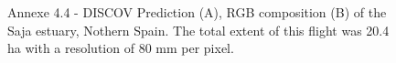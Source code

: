 \documentclass[
  letterpaper,
  11pt,
  english,
  singlespacing,
  headsepline]{MastersDoctoralThesis}
\newcommand{\chaptertopimage}{Chapter1/img/seagrasses.png}
\newcommand{\chapterbottomimage}{Chapter1/img/seagrasses.png}
\begin{document}
\begin{spacing}{1.5}
\begin{figure}


\caption{\label{fig-Saja_g}Annexe 4.4 - DISCOV Prediction (A), RGB
composition (B) of the Saja estuary, Nothern Spain. The total extent of
this flight was 20.4 ha with a resolution of 80 mm per pixel.}

\end{figure}%

\end{spacing}

\renewcommand{\chaptertopimage}{Chapter5/img/top.png}
\renewcommand{\chapterbottomimage}{Chapter5/img/Bottom.png}

\newpage\null\thispagestyle{empty}\newpage
\end{document}

